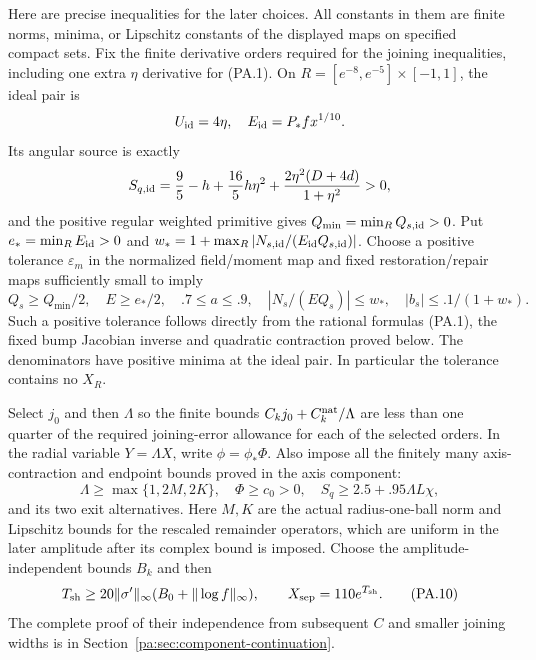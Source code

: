 \documentclass[10pt,a4paper]{article}
\begin{document}
Here are precise inequalities for the later choices. All constants in them are
finite norms, minima, or Lipschitz constants of the displayed maps on specified
compact sets. Fix the finite derivative orders required for the joining inequalities,
including one extra $\eta$ derivative for (PA.1). On
$R=[e^{-8},e^{-5}]\times[-1,1]$, the ideal pair is
\[
 U_{\rm id}=4\eta,\quad E_{\rm id}=P_*fx^{1/10}.
\]
Its angular source is exactly
\[
 S_{q,\rm id}=\frac95-h+\frac{16}{5}h\eta^2
     +\frac{2\eta^2(D+4d)}{1+\eta^2}>0,
\]
and the positive regular weighted primitive gives $Q_{\min}=\min_RQ_{s,\rm id}>0$.
Put $e_*=\min_RE_{\rm id}>0$ and
$w_*=1+\max_R|N_{s,\rm id}/(E_{\rm id}Q_{s,\rm id})|$.
Choose a positive tolerance $\varepsilon_m$ in the normalized field/moment map
and fixed restoration/repair maps sufficiently small to imply
\[
 Q_s\ge Q_{\min}/2,\quad E\ge e_*/2,\quad .7\le a\le.9,
 \quad |N_s/(EQ_s)|\le w_*,\quad |b_s|\le .1/(1+w_*).            \tag{PA.9}
\]
Such a positive tolerance follows directly from the rational formulas (PA.1), the
fixed bump Jacobian inverse and quadratic contraction proved below. The
denominators have positive minima at the ideal pair. In particular the tolerance
contains no $X_R$.

Select $j_0$ and then $\Lambda$ so the finite bounds
$C_kj_0+C_k^{\rm nat}/\Lambda$ are less than one quarter of the required
joining-error allowance for each of the selected orders. In the radial variable
$Y=\Lambda X$, write $\phi=\phi_*\Phi$. Also impose all the
finitely many axis-contraction and endpoint bounds proved in the axis component:
\[
 \Lambda\ge\max\{1,2M,2K\},\quad \Phi\ge c_0>0,\quad
 S_q\ge2.5+.95\Lambda L\chi,
\]
and its two exit alternatives. Here $M,K$ are the actual radius-one-ball norm
and Lipschitz bounds for the rescaled remainder operators, which are uniform in
the later amplitude after its complex bound is imposed.
Choose the amplitude-independent bounds $B_k$ and then
\[
 T_{\rm sh}\ge20\|\sigma'\|_\infty(B_0+\|\log f\|_\infty),
 \qquad X_{\rm sep}=110e^{T_{\rm sh}}.                           \tag{PA.10}
\]
The complete proof of their independence from subsequent $C$ and smaller joining
widths is in Section~\ref{pa:sec:component-continuation}.
\end{document}
